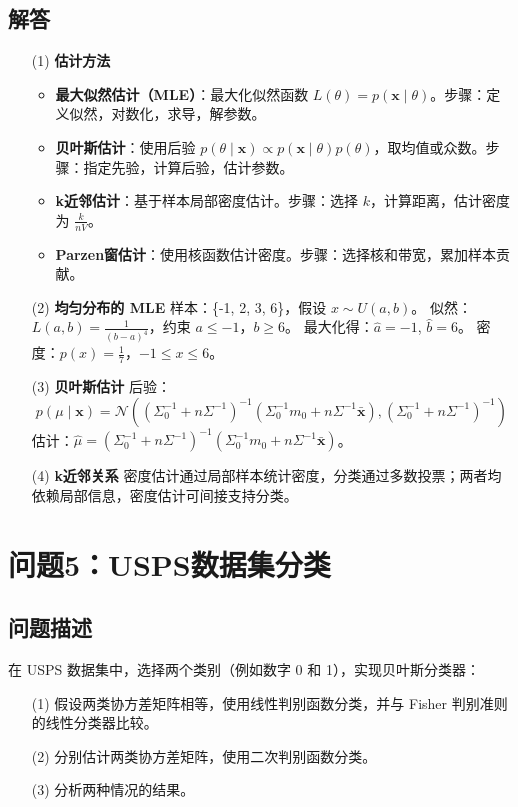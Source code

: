 \documentclass[UTF8]{report}
\theoremstyle{MyLineTheoremStyle} %
\theoremstyle{MyBlockTheoremStyle} %
\theoremstyle{MySubsubsectionStyle} %
\begin{document}
\subsection{解答}
\begin{itemize}
    \item[(1)] \textbf{估计方法}  
    \begin{itemize}
        \item \textbf{最大似然估计（MLE）}：最大化似然函数 \( L(\theta) = p(\mathbf{x} \mid \theta) \)。步骤：定义似然，对数化，求导，解参数。
        \item \textbf{贝叶斯估计}：使用后验 \( p(\theta \mid \mathbf{x}) \propto p(\mathbf{x} \mid \theta) p(\theta) \)，取均值或众数。步骤：指定先验，计算后验，估计参数。
        \item \textbf{k近邻估计}：基于样本局部密度估计。步骤：选择 \( k \)，计算距离，估计密度为 \(\frac{k}{nV}\)。
        \item \textbf{Parzen窗估计}：使用核函数估计密度。步骤：选择核和带宽，累加样本贡献。
    \end{itemize}
    \item[(2)] \textbf{均匀分布的 MLE}  
    样本：\{-1, 2, 3, 6\}，假设 \( x \sim U(a, b) \)。  
    似然：\( L(a, b) = \frac{1}{(b - a)^4} \)，约束 \( a \leq -1 \)，\( b \geq 6 \)。  
    最大化得：\(\hat{a} = -1\), \(\hat{b} = 6\)。  
    密度：\( p(x) = \frac{1}{7} \)，\( -1 \leq x \leq 6 \)。
    \item[(3)] \textbf{贝叶斯估计}  
    后验：  
    \[
    p(\mu \mid \mathbf{x}) = \mathcal{N}\left( \left( \Sigma_0^{-1} + n \Sigma^{-1} \right)^{-1} \left( \Sigma_0^{-1} m_0 + n \Sigma^{-1} \bar{\mathbf{x}} \right), \left( \Sigma_0^{-1} + n \Sigma^{-1} \right)^{-1} \right)
    \]  
    估计：\(\hat{\mu} = \left( \Sigma_0^{-1} + n \Sigma^{-1} \right)^{-1} \left( \Sigma_0^{-1} m_0 + n \Sigma^{-1} \bar{\mathbf{x}} \right)\)。
    \item[(4)] \textbf{k近邻关系}  
    密度估计通过局部样本统计密度，分类通过多数投票；两者均依赖局部信息，密度估计可间接支持分类。
\end{itemize}

\section{问题5：USPS数据集分类}

\subsection{问题描述}
在 USPS 数据集中，选择两个类别（例如数字 0 和 1），实现贝叶斯分类器：  
\begin{enumerate}
    \item[(1)] 假设两类协方差矩阵相等，使用线性判别函数分类，并与 Fisher 判别准则的线性分类器比较。
    \item[(2)] 分别估计两类协方差矩阵，使用二次判别函数分类。
    \item[(3)] 分析两种情况的结果。
\end{enumerate}
\end{document}
